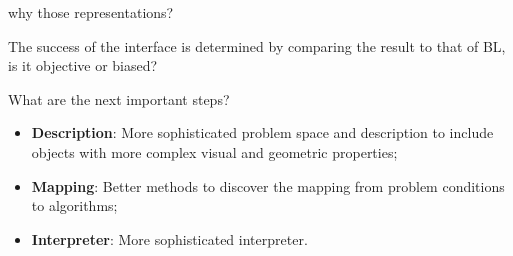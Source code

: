 \documentclass[10pt]{beamer}
\begin{document}
\begin{frame}

\begin{alertblock}{why those representations?}
\end{alertblock}

\end{frame}

\begin{frame}

\begin{alertblock}{The success of the interface is determined by comparing the result to that of BL, is it objective or biased?}
\end{alertblock}

\end{frame}

\begin{frame}

\begin{alertblock}{What are the next important steps?}
\begin{itemize}
\item \textbf{Description}: More sophisticated problem space and description to include objects with more complex visual and geometric properties;
\item \textbf{Mapping}: Better methods to discover the mapping from problem conditions to algorithms;
\item \textbf{Interpreter}: More sophisticated interpreter.
\end{itemize}
\end{alertblock}

\end{frame}
\end{document}
